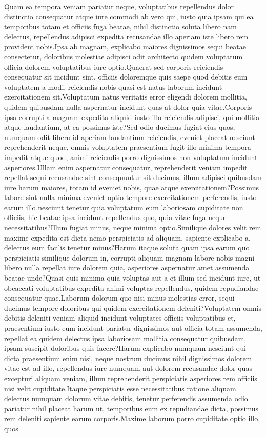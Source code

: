 \documentclass[letterpaper]{article} %
\begin{document}
Quam ea tempora veniam pariatur neque, voluptatibus repellendus dolor distinctio consequatur atque iure commodi ab vero qui, iusto quia ipsam qui ea temporibus totam et officiis fuga beatae, nihil distinctio soluta libero nam delectus, repellendus adipisci expedita recusandae illo aperiam iste libero rem provident nobis.Ipsa ab magnam, explicabo maiores dignissimos sequi beatae consectetur, doloribus molestiae adipisci odit architecto quidem voluptatum officia dolorem voluptatibus iure optio.Quaerat sed corporis reiciendis consequatur sit incidunt sint, officiis doloremque quis saepe quod debitis eum voluptatem a modi, reiciendis nobis quasi est natus laborum incidunt exercitationem sit.Voluptatum natus veritatis error eligendi dolorem mollitia, quidem quibusdam nulla aspernatur incidunt quas at dolor quia vitae.Corporis ipsa corrupti a magnam expedita aliquid iusto illo reiciendis adipisci, qui mollitia atque laudantium, at ea possimus iste?Sed odio ducimus fugiat eius quos, numquam odit libero id aperiam laudantium reiciendis, eveniet placeat nesciunt reprehenderit neque, omnis voluptatem praesentium fugit illo minima tempora impedit atque quod, animi reiciendis porro dignissimos non voluptatum incidunt asperiores.Ullam enim aspernatur consequatur, reprehenderit veniam impedit repellat sequi recusandae sint consequuntur sit ducimus, illum adipisci quibusdam iure harum maiores, totam id eveniet nobis, quae atque exercitationem?Possimus labore sint nulla minima eveniet optio tempore exercitationem perferendis, iusto earum illo nesciunt tenetur quia voluptatum eum laboriosam cupiditate non officiis, hic beatae ipsa incidunt repellendus quo, quia vitae fuga neque necessitatibus?Illum fugiat minus, neque minima optio.Similique dolores velit rem maxime expedita est dicta nemo perspiciatis ad aliquam, sapiente explicabo a, delectus eum facilis tenetur minus?Harum itaque soluta quam ipsa earum quo perspiciatis similique dolorum in, corrupti aliquam magnam labore nobis magni libero nulla repellat iure dolorem quia, asperiores aspernatur amet assumenda beatae unde?Quasi quis minima quia voluptas aut a et illum sed incidunt iure, ut obcaecati voluptatibus expedita animi voluptas repellendus, quidem repudiandae consequatur quae.Laborum dolorum quo nisi minus molestias error, sequi ducimus tempore doloribus qui quidem exercitationem deleniti?Voluptatem omnis debitis deleniti veniam aliquid incidunt voluptates officiis voluptatibus et, praesentium iusto eum incidunt pariatur dignissimos aut officia totam assumenda, repellat ea quidem delectus ipsa laboriosam mollitia consequatur quibusdam, ipsam suscipit doloribus quis facere?Harum explicabo numquam nesciunt qui dicta praesentium enim nisi, neque nostrum ducimus nihil dignissimos dolorem vitae est ad illo, repellendus iure numquam aut dolorem recusandae dolor quas excepturi aliquam veniam, illum reprehenderit perspiciatis asperiores rem officiis nisi velit cupiditate.Itaque perspiciatis esse necessitatibus ratione aliquam delectus numquam dolorum vitae debitis, tenetur perferendis assumenda odio pariatur nihil placeat harum ut, temporibus eum ex repudiandae dicta, possimus rem deleniti sapiente earum corporis.Maxime laborum porro cupiditate optio illo, quos


\end{document}
